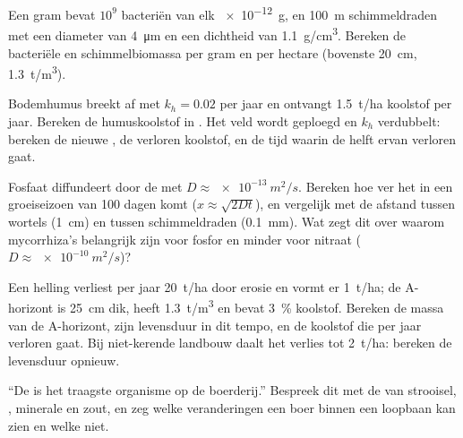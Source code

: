 \begin{exercise}[$\star\star$]\label{exo:b2:living-soil:8}
Een gram  bevat $10^{9}$ bacteriën van elk \qty{e-12}{g},
en \qty{100}{m} schimmeldraden met een diameter van \qty{4}{\micro m} en een
dichtheid van \qty{1.1}{g/cm^3}. Bereken de bacteriële en schimmelbiomassa per
gram en per hectare (bovenste \qty{20}{cm}, \qty{1.3}{t/m^3}).
\end{exercise}

\begin{exercise}[$\star\star$]\label{exo:b2:living-soil:9}
Bodemhumus breekt af met $k_h = 0.02$ per jaar en ontvangt
\qty{1.5}{t/ha} koolstof per jaar. Bereken de humuskoolstof in . Het veld wordt geploegd en $k_h$ verdubbelt: bereken de nieuwe
, de verloren koolstof, en de tijd waarin de helft ervan
verloren gaat.
\end{exercise}

\begin{exercise}[$\star\star\star$]\label{exo:b2:living-soil:10}
Fosfaat diffundeert door de  met $D \approx \qty{e-13}{m^2/s}$.
Bereken hoe ver het in een groeiseizoen van \num{100} dagen komt
($x \approx \sqrt{2Dt}$), en vergelijk met de afstand tussen wortels
(\qty{1}{cm}) en tussen schimmeldraden (\qty{0.1}{mm}). Wat zegt dit
over waarom mycorrhiza's belangrijk zijn voor fosfor en minder voor nitraat
($D \approx \qty{e-10}{m^2/s}$)?
\end{exercise}

\begin{exercise}[$\star\star\star$]\label{exo:b2:living-soil:11}
Een helling verliest per jaar \qty{20}{t/ha}  door erosie en
vormt er \qty{1}{t/ha}; de A-horizont is \qty{25}{cm} dik, heeft
\qty{1.3}{t/m^3} en bevat \qty{3}{\%} koolstof. Bereken de massa van de
A-horizont, zijn levensduur in dit tempo, en de koolstof die per jaar
verloren gaat. Bij niet-kerende landbouw daalt het verlies tot \qty{2}{t/ha}:
bereken de levensduur opnieuw.
\end{exercise}

\begin{exercise}[$\star\star\star$]\label{exo:b2:living-soil:12}
``De  is het traagste organisme op de boerderij.'' Bespreek dit met de
 van strooisel, , minerale  en zout, en zeg
welke veranderingen een boer binnen een loopbaan kan zien en welke niet.
\end{exercise}

